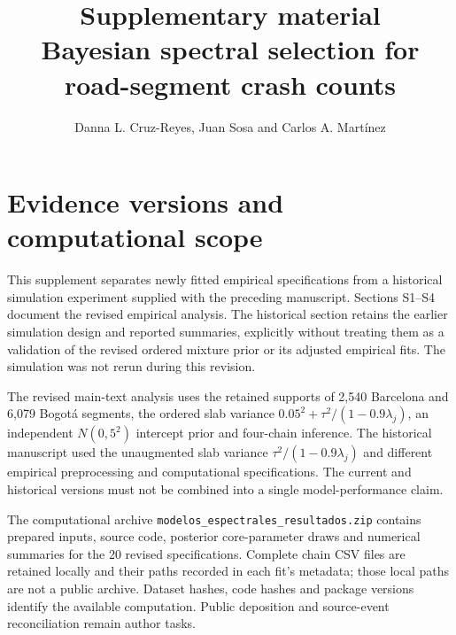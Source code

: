 \documentclass[11pt]{article}
\title{Supplementary material\\Bayesian spectral selection for road-segment crash counts}
\author{Danna L. Cruz-Reyes, Juan Sosa and Carlos A. Mart\'inez}
\date{}
\begin{document}
\maketitle
\section{Evidence versions and computational scope}
This supplement separates newly fitted empirical specifications from a historical simulation experiment supplied with the preceding manuscript. Sections S1--S4 document the revised empirical analysis. The historical section retains the earlier simulation design and reported summaries, explicitly without treating them as a validation of the revised ordered mixture prior or its adjusted empirical fits. The simulation was not rerun during this revision.

The revised main-text analysis uses the retained supports of 2,540 Barcelona and 6,079 Bogot\'a segments, the ordered slab variance $0.05^2+\tau^2/(1-0.9\lambda_j)$, an independent $N(0,5^2)$ intercept prior and four-chain inference. The historical manuscript used the unaugmented slab variance $\tau^2/(1-0.9\lambda_j)$ and different empirical preprocessing and computational specifications. The current and historical versions must not be combined into a single model-performance claim.

The computational archive \texttt{modelos\_espectrales\_resultados.zip} contains prepared inputs, source code, posterior core-parameter draws and numerical summaries for the 20 revised specifications. Complete chain CSV files are retained locally and their paths recorded in each fit's metadata; those local paths are not a public archive. Dataset hashes, code hashes and package versions identify the available computation. Public deposition and source-event reconciliation remain author tasks.
\end{document}
